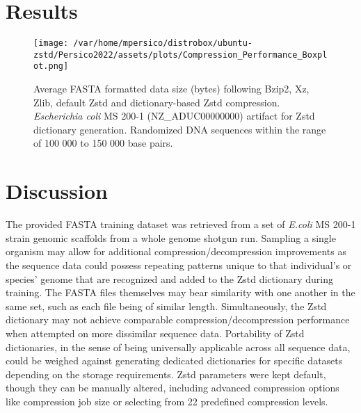\documentclass[
  10pt,
  letterpaper,
]{article}
\begin{document}
\hypertarget{results}{%
\section{Results}\label{results}}

\begin{figure}

{\centering \texttt{[image: /var/home/mpersico/distrobox/ubuntu-zstd/Persico2022/assets/plots/Compression\_Performance\_Boxplot.png]}

}

\caption{\label{fig-performance}Average FASTA formatted data size
(bytes) following Bzip2, Xz, Zlib, default Zstd and dictionary-based
Zstd compression. \emph{Escherichia coli} MS 200-1 (NZ\_ADUC00000000)
artifact for Zstd dictionary generation. Randomized DNA sequences within
the range of 100 000 to 150 000 base pairs.}

\end{figure}

\hypertarget{discussion}{%
\section{Discussion}\label{discussion}}

The provided FASTA training dataset was retrieved from a set of
\textit{E.coli} MS 200-1 strain genomic scaffolds from a whole genome
shotgun run\citep{ncbi}. Sampling a single organism may allow for
additional compression/decompression improvements as the sequence data
could possess repeating patterns unique to that individual's or species'
genome that are recognized and added to the Zstd dictionary during
training. The FASTA files themselves may bear similarity with one
another in the same set, such as each file being of similar length.
Simultaneously, the Zstd dictionary may not achieve comparable
compression/decompression performance when attempted on more dissimilar
sequence data. Portability of Zstd dictionaries, in the sense of being
universally applicable across all sequence data, could be weighed
against generating dedicated dictionaries for specific datasets
depending on the storage requirements. Zstd parameters were kept
default, though they can be manually altered, including advanced
compression options like compression job size or selecting from 22
predefined compression levels\citep{facebook}.
\end{document}
